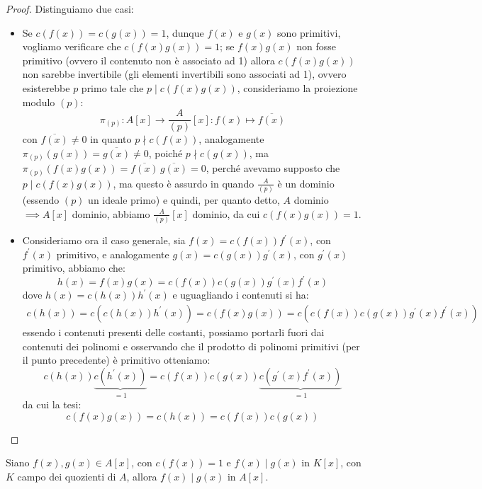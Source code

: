 \documentclass[11pt]{scrartcl}
\begin{document}
\begin{proof}
    Distinguiamo due casi:
    \begin{itemize}
        \item Se $c(f(x)) = c(g(x)) = 1$, dunque $f(x)$ e $g(x)$ sono primitivi, vogliamo verificare che $c(f(x)g(x)) = 1$; se $f(x)g(x)$ non fosse primitivo (ovvero il contenuto non è associato ad 1)
            allora $c(f(x)g(x))$ non sarebbe invertibile (gli elementi invertibili sono associati ad 1), ovvero esisterebbe $p$ primo tale che $p \mid c(f(x)g(x))$, consideriamo la proiezione modulo $(p)$:
            \[ \pi_{(p)} : A[x] \longrightarrow \frac{A}{(p)}[x] : f(x) \longmapsto \overline{f(x)}
                \]
            con $\overline{f(x)} \ne 0$ in quanto $p \nmid c(f(x))$, analogamente $\pi_{(p)}(g(x)) = \overline{g(x)} \ne 0$, poiché $p \nmid c(g(x))$, ma $\pi_{(p)}(f(x)g(x)) = \overline{f(x)}\,\overline{g(x)} = 0$, 
            perché avevamo supposto che $p \mid c(f(x)g(x))$, ma questo è assurdo in quando $\displaystyle \frac{A}{(p)}$ è un dominio (essendo $(p)$ un ideale primo) e quindi, per quanto detto, $A$ dominio$\implies A[x]$ dominio, abbiamo $\displaystyle \frac{A}{(p)} [x]$
            dominio, da cui $c(f(x)g(x)) = 1$.
        \item Consideriamo ora il caso generale, sia $f(x) = c(f(x))f^{\prime}(x)$, con $f^{\prime}(x)$ primitivo, e analogamente $g(x) = c(g(x))g^{\prime}(x)$, con $g^{\prime}(x)$ primitivo, abbiamo che:
            \[ h(x) = f(x)g(x) = c(f(x))c(g(x))g^{\prime}(x)f^{\prime}(x)
                \]
            dove $h(x) = c(h(x))h^{\prime}(x)$ e uguagliando i contenuti si ha:
            \begin{multline*}
                c(h(x)) = c(c(h(x))h^{\prime}(x)) = c(f(x)g(x)) = c(c(f(x))c(g(x))g^{\prime}(x)f^{\prime}(x))
            \end{multline*}
            essendo i contenuti presenti delle costanti, possiamo portarli fuori dai contenuti dei polinomi e osservando che il prodotto di polinomi primitivi (per il punto precedente) è primitivo otteniamo:
            \[ c(h(x))\underbrace{c(h^{\prime}(x))}_{= 1} = c(f(x))c(g(x))\underbrace{c(g^{\prime}(x)f^{\prime}(x))}_{= 1}
                \]
            da cui la tesi:
            \[ c(f(x)g(x)) = c(h(x)) = c(f(x))c(g(x))
                \]
    \end{itemize}
\end{proof}

\begin{corollary}
    \label{2.118}
    Siano $f(x),g(x) \in A[x]$, con $c(f(x)) = 1$ e $f(x) \mid g(x)$ in $K[x]$, con $K$ campo dei quozienti di $A$, allora $f(x) \mid g(x)$ in $A[x]$.
\end{corollary}
\end{document}
